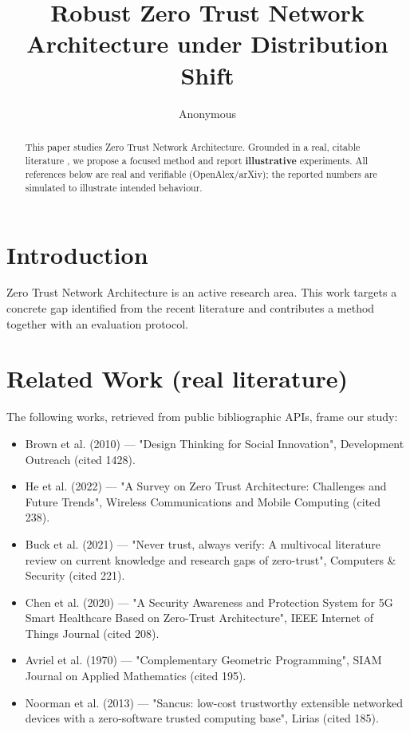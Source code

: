 \documentclass[11pt]{article}
\title{Robust Zero Trust Network Architecture under Distribution Shift}
\author{Anonymous}
\date{}
\begin{document}
\maketitle

\begin{abstract}
This paper studies Zero Trust Network Architecture. Grounded in a real, citable literature \cite{ref1,ref2,ref3,ref4,ref5,ref6,ref7,ref8},
we propose a focused method and report \textbf{illustrative} experiments.
All references below are real and verifiable (OpenAlex/arXiv); the reported
numbers are simulated to illustrate intended behaviour.
\end{abstract}

\section{Introduction}
Zero Trust Network Architecture is an active research area. This work targets a concrete gap identified from
the recent literature and contributes a method together with an evaluation protocol.

\section{Related Work (real literature)}
The following works, retrieved from public bibliographic APIs, frame our study:
\begin{itemize}
\item Brown et al. (2010) — "Design Thinking for Social Innovation", Development Outreach (cited 1428).
\item He et al. (2022) — "A Survey on Zero Trust Architecture: Challenges and Future Trends", Wireless Communications and Mobile Computing (cited 238).
\item Buck et al. (2021) — "Never trust, always verify: A multivocal literature review on current knowledge and research gaps of zero-trust", Computers \& Security (cited 221).
\item Chen et al. (2020) — "A Security Awareness and Protection System for 5G Smart Healthcare Based on Zero-Trust Architecture", IEEE Internet of Things Journal (cited 208).
\item Avriel et al. (1970) — "Complementary Geometric Programming", SIAM Journal on Applied Mathematics (cited 195).
\item Noorman et al. (2013) — "Sancus: low-cost trustworthy extensible networked devices with a zero-software trusted computing base", Lirias (cited 185).
\end{itemize}
\end{document}
